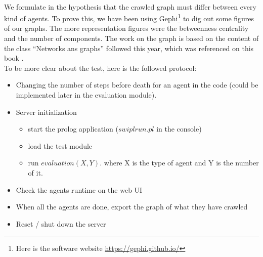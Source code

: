 \documentclass{article}
\newenvironment{itemh}[0]{\begin{itemize}[font=\color{mygray} \small]}{\end{itemize}}
\newenvironment{itemH}[0]{\begin{itemize}[font=\color{mygray} \large]}{\end{itemize}}
\begin{document}
		\paragraph{}
			We formulate in the hypothesis that the crawled graph must differ between every kind of agents.
			To prove this, we have been using Gephi\footnote{
				Here is the software website \url{https://gephi.github.io/}
			} to dig out some figures of our graphs.
			The more representation figures were the betweenness centrality and the number of components.
			The work on the graph is based on the content of the class ``Networks ans graphs'' followed this year,
			which was referenced on this book \cite{Steen10}.\\
		\newline
			To be more clear about the test, here is the followed protocol:
			\begin{itemH}
				\item Changing the number of steps before death for an agent in the code
				(could be implemented later in the evaluation module).
				\item Server initialization
				\begin{itemh}
					\item start the prolog application ($swipl run.pl$ in the console)
					\item load the test module
					\item run $evaluation(X,Y).$ where X is the type of agent and Y is the number of it.
				\end{itemh}
				\item Check the agents runtime on the web UI
				\item When all the agents are done, export the graph of what they have crawled
				\item Reset / shut down the server
			\end{itemH}
\end{document}
